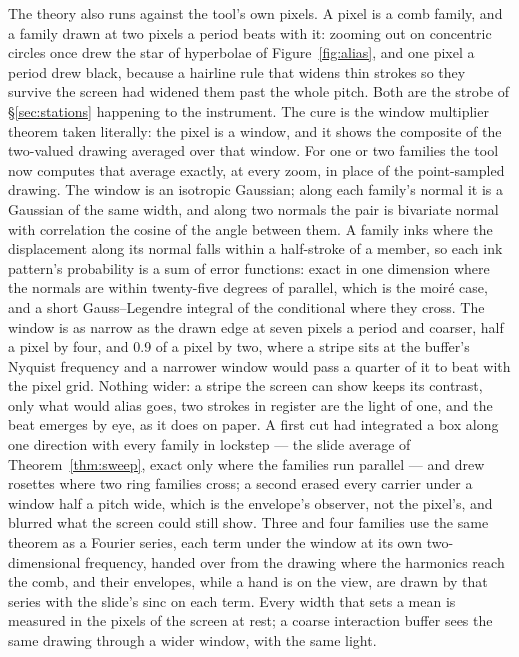 The theory also runs against the tool's own pixels. A pixel is a comb
family, and a family drawn at two pixels a period beats with it: zooming
out on concentric circles once drew the star of hyperbolae of
Figure~\ref{fig:alias}, and one pixel a period drew black, because a
hairline rule that widens thin strokes so they survive the screen had
widened them past the whole pitch. Both are the strobe of
\S\ref{sec:stations} happening to the instrument. The cure is the window
multiplier theorem taken literally: the pixel is a window, and it shows
the composite of the two-valued drawing averaged over that window. For
one or two families the tool now computes that average exactly, at every
zoom, in place of the point-sampled drawing. The window is an isotropic
Gaussian; along each family's normal it is a Gaussian of the same width,
and along two normals the pair is bivariate normal with correlation the
cosine of the angle between them. A family inks where the displacement
along its normal falls within a half-stroke of a member, so each ink
pattern's probability is a sum of error functions: exact in one dimension
where the normals are within twenty-five degrees of parallel, which is
the moir\'e case, and a short Gauss--Legendre integral of the conditional
where they cross. The window is as narrow as the drawn edge at seven
pixels a period and coarser, half a pixel by four, and 0.9 of a pixel by
two, where a stripe sits at the buffer's Nyquist frequency and a narrower
window would pass a quarter of it to beat with the pixel grid. Nothing
wider: a stripe the screen can show keeps its contrast, only what would
alias goes, two strokes in register are the light of one, and the beat
emerges by eye, as it does on paper. A first cut had integrated a box
along one direction with every family in lockstep --- the slide average
of Theorem~\ref{thm:sweep}, exact only where the families run parallel
--- and drew rosettes where two ring families cross; a second erased every
carrier under a window half a pitch wide, which is the envelope's
observer, not the pixel's, and blurred what the screen could still show.
Three and four families use the same theorem as a Fourier series, each
term under the window at its own two-dimensional frequency, handed over
from the drawing where the harmonics reach the comb, and their envelopes,
while a hand is on the view, are drawn by that series with the slide's
sinc on each term. Every width that sets a mean is measured in the pixels
of the screen at rest; a coarse interaction buffer sees the same drawing
through a wider window, with the same light.

